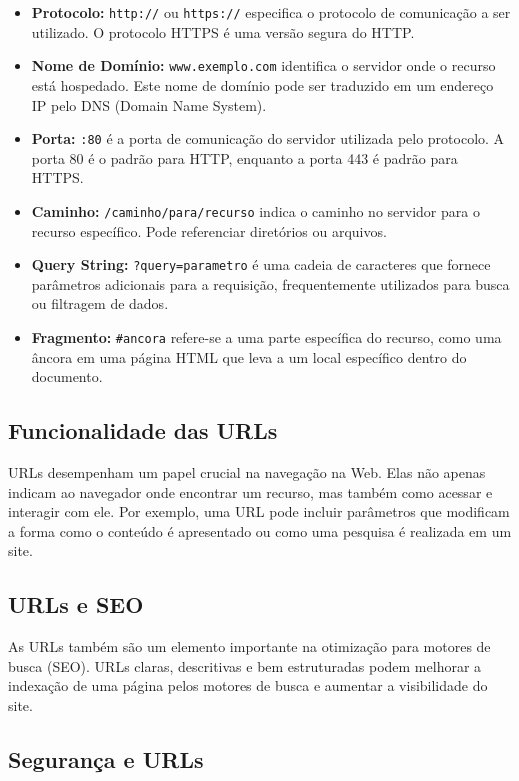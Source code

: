 \begin{itemize}
    \item \textbf{Protocolo:} \texttt{http://} ou \texttt{https://} especifica o protocolo de comunicação a ser utilizado. O protocolo HTTPS é uma versão segura do HTTP.
    \item \textbf{Nome de Domínio:} \texttt{www.exemplo.com} identifica o servidor onde o recurso está hospedado. Este nome de domínio pode ser traduzido em um endereço IP pelo DNS (Domain Name System).
    \item \textbf{Porta:} \texttt{:80} é a porta de comunicação do servidor utilizada pelo protocolo. A porta 80 é o padrão para HTTP, enquanto a porta 443 é padrão para HTTPS.
    \item \textbf{Caminho:} \texttt{/caminho/para/recurso} indica o caminho no servidor para o recurso específico. Pode referenciar diretórios ou arquivos.
    \item \textbf{Query String:} \texttt{?query=parametro} é uma cadeia de caracteres que fornece parâmetros adicionais para a requisição, frequentemente utilizados para busca ou filtragem de dados.
    \item \textbf{Fragmento:} \texttt{\#ancora} refere-se a uma parte específica do recurso, como uma âncora em uma página HTML que leva a um local específico dentro do documento.
\end{itemize}

\subsection{Funcionalidade das URLs}

URLs desempenham um papel crucial na navegação na Web. Elas não apenas indicam ao navegador onde encontrar um recurso, mas também como acessar e interagir com ele. Por exemplo, uma URL pode incluir parâmetros que modificam a forma como o conteúdo é apresentado ou como uma pesquisa é realizada em um site.

\subsection{URLs e SEO}

As URLs também são um elemento importante na otimização para motores de busca (SEO). URLs claras, descritivas e bem estruturadas podem melhorar a indexação de uma página pelos motores de busca e aumentar a visibilidade do site.

\subsection{Segurança e URLs}

